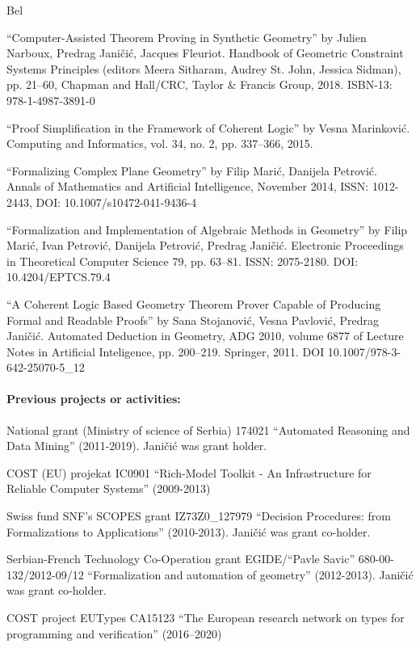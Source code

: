 \begin{sitedescription}{Bel}
  \begin{compactitem}
  \item ``Computer-Assisted Theorem Proving in Synthetic Geometry'' by
    Julien Narboux, Predrag Janičić, Jacques Fleuriot. Handbook of
    Geometric Constraint Systems Principles (editors Meera Sitharam,
    Audrey St. John, Jessica Sidman), pp. 21--60, Chapman and
    Hall/CRC, Taylor \& Francis Group, 2018. ISBN-13: 978-1-4987-3891-0
  \item ``Proof Simplification in the Framework of Coherent Logic'' by
    Vesna Marinković. Computing and Informatics, vol. 34, no. 2,
    pp. 337--366, 2015.
  \item ``Formalizing Complex Plane Geometry'' by Filip Marić,
    Danijela Petrović. Annals of Mathematics and Artificial
    Intelligence, November 2014, ISSN: 1012-2443, DOI:
    10.1007/s10472-041-9436-4
  \item ``Formalization and Implementation of Algebraic Methods in
    Geometry'' by Filip Marić, Ivan Petrović, Danijela Petrović,
    Predrag Janičić. Electronic Proceedings in Theoretical Computer
    Science 79, pp. 63--81. ISSN: 2075-2180. DOI: 10.4204/EPTCS.79.4
  \item ``A Coherent Logic Based Geometry Theorem Prover Capable of
    Producing Formal and Readable Proofs'' by Sana Stojanović, Vesna
    Pavlović, Predrag Janičić. Automated Deduction in Geometry, ADG
    2010, volume 6877 of Lecture Notes in Artificial Inteligence,
    pp. 200--219. Springer, 2011. DOI 10.1007/978-3-642-25070-5\_12
  \end{compactitem}
    
  \paragraph{Previous projects or activities:}
  
  \begin{compactitem}
  \item National grant (Ministry of science of Serbia) 174021
    ``Automated Reasoning and Data Mining'' (2011-2019). Janičić was
    grant holder.
  \item COST (EU) projekat IC0901 ``Rich-Model Toolkit - An
    Infrastructure for Reliable Computer Systems'' (2009-2013)
  \item Swiss fund SNF's SCOPES grant IZ73Z0\_127979 ``Decision
    Procedures: from Formalizations to Applications''
    (2010-2013). Jani\v ci\'c was grant co-holder.
  \item Serbian-French Technology Co-Operation grant EGIDE/``Pavle
    Savic'' 680-00-132/2012-09/12 ``Formalization and automation of
    geometry'' (2012-2013). Jani\v ci\'c was grant co-holder.
  \item COST project EUTypes CA15123 ``The European research network on types for programming and verification'' (2016--2020) 
  \end{compactitem}


\end{sitedescription}

